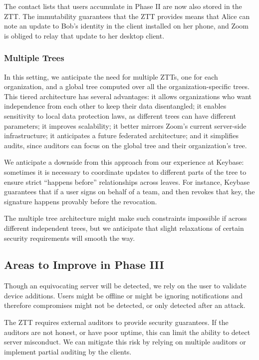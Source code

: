 The contact lists that users accumulate in Phase II are now also stored in the ZTT. The immutability guarantees that the ZTT provides means that Alice can note an update to Bob's identity in the client installed on her phone, and Zoom is obliged to relay that update to her desktop client.

\subsubsection{Multiple Trees}

In this setting, we anticipate the need for multiple ZTTs, one for each organization, and a global tree computed over all the organization-specific trees. This tiered architecture has several advantages: it allows organizations who want independence from each other to keep their data disentangled; it enables sensitivity to local data protection laws, as different trees can have different parameters; it improves scalability; it better mirrors Zoom's current server-side infrastructure; it anticipates a future federated architecture; and it simplifies audits, since auditors can focus on the global tree and their organization's tree.

We anticipate a downside from this approach from our experience at Keybase: sometimes it is necessary to coordinate updates to different parts of the tree to ensure strict ``happens before'' relationships across leaves. For instance, Keybase guarantees that if a user signs on behalf of a team, and then revokes that key, the signature happens provably before the revocation.

The multiple tree architecture might make such constraints impossible if across different independent trees, but we anticipate that slight relaxations of certain security requirements will smooth the way.

\subsection{Areas to Improve in Phase III}

Though an equivocating server will be detected, we rely on the user to validate device additions. Users might be offline or might be ignoring notifications and therefore compromises might not be detected, or only detected after an attack.

The ZTT requires external auditors to provide security guarantees. If the auditors are not honest, or have poor uptime, this can limit the ability to detect server misconduct. We can mitigate this risk by relying on multiple auditors or implement partial auditing by the clients.